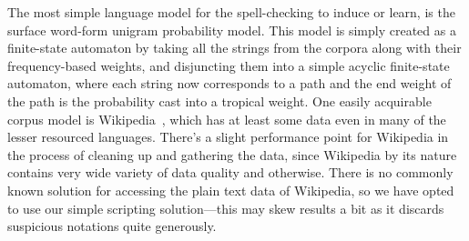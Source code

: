 \documentclass[a4paper,12pt]{article}
\begin{document}
The most simple language model for the spell-checking to induce or learn, is
the surface word-form unigram probability model. This model is simply created
as a finite-state automaton by taking all the strings from the corpora along
with their frequency-based weights, and disjuncting them into a simple acyclic
finite-state automaton, where each string now corresponds to a path and the end
weight of the path is the probability cast into a tropical weight. One easily
acquirable corpus model is Wikipedia~\cite[]{pirinen/2010/lrec}, which has at
least some data even in many of the lesser resourced languages. There's a
slight performance point for Wikipedia in the process of cleaning up and
gathering the data, since Wikipedia by its nature contains very wide variety
of data quality and otherwise. There is no commonly known solution for
accessing the plain text data of Wikipedia, so we have opted to use our
simple scripting solution---this may skew results a bit as it discards
suspicious notations quite generously.
\end{document}
